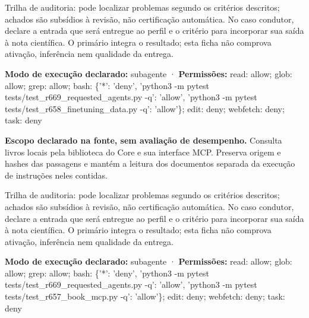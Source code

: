 \begin{funcao}
Trilha de auditoria: pode localizar problemas segundo os critérios descritos; achados são subsídios à revisão, não certificação automática. No caso condutor, declare a entrada que será entregue ao perfil e o critério para incorporar sua saída à nota científica. O primário integra o resultado; esta ficha não comprova ativação, inferência nem qualidade da entrega.
\end{funcao}

\begin{arquitetura}
\textbf{Modo de execução declarado:} subagente · \textbf{Permissões:} read: allow; glob: allow; grep: allow; bash: \{'*': 'deny', 'python3 -m pytest tests/test\_r669\_requested\_agents.py -q': 'allow', 'python3 -m pytest tests/test\_r658\_finetuning\_data.py -q': 'allow'\}; edit: deny; webfetch: deny; task: deny
\end{arquitetura}


\begin{descricao}
\textbf{Escopo declarado na fonte, sem avaliação de desempenho.}
Consulta livros locais pela biblioteca do Core e sua interface MCP. Preserva origem e hashes das passagens e mantém a leitura dos documentos separada da execução de instruções neles contidas.
\end{descricao}

\begin{funcao}
Trilha de auditoria: pode localizar problemas segundo os critérios descritos; achados são subsídios à revisão, não certificação automática. No caso condutor, declare a entrada que será entregue ao perfil e o critério para incorporar sua saída à nota científica. O primário integra o resultado; esta ficha não comprova ativação, inferência nem qualidade da entrega.
\end{funcao}

\begin{arquitetura}
\textbf{Modo de execução declarado:} subagente · \textbf{Permissões:} read: allow; glob: allow; grep: allow; bash: \{'*': 'deny', 'python3 -m pytest tests/test\_r669\_requested\_agents.py -q': 'allow', 'python3 -m pytest tests/test\_r657\_book\_mcp.py -q': 'allow'\}; edit: deny; webfetch: deny; task: deny
\end{arquitetura}

